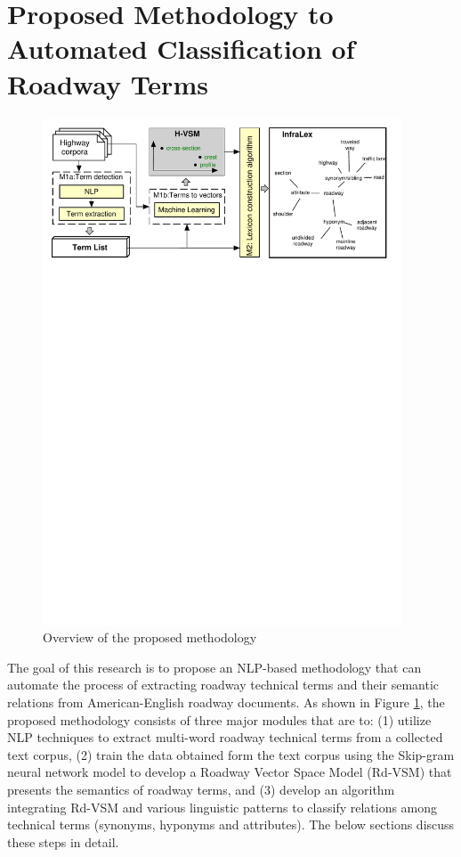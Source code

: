 \documentclass[Journal, BackFigs,NoLists, DoubleSpace]{ascelike}%
\begin{document}
\section{Proposed Methodology to Automated Classification of Roadway Terms} \label{sec:RoadLex}
\begin{figure}[t]
	\centering
	\includegraphics[width=0.95\textwidth]{Figure1_overview_methodology}
	\caption{Overview of the proposed methodology}
	\label{fig:framework}
\end{figure}
%
The goal of this research is to propose an NLP-based methodology that can automate the process of extracting roadway technical terms and their semantic relations from American-English roadway documents. As shown in Figure \ref{fig:framework}, the proposed methodology consists of three major modules that are to: (1) utilize NLP techniques to extract multi-word roadway technical terms from a collected text corpus, (2) train the data obtained form the text corpus using the Skip-gram neural network model \cite{mikolov13a} to develop a Roadway Vector Space Model (Rd-VSM) that presents the semantics of roadway terms, and (3) develop an algorithm integrating Rd-VSM and various linguistic patterns to classify relations among technical terms (synonyms, hyponyms and attributes). The below sections discuss these steps in detail.
\end{document}
